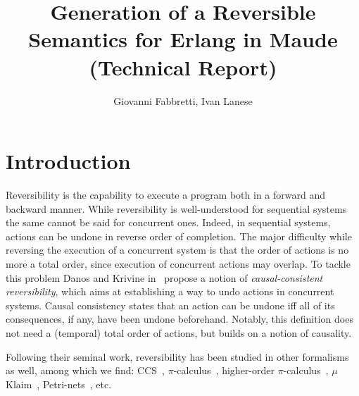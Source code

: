 \documentclass{article}[12pt,a4paper]
\theoremstyle{definition}
\begin{document}
\title{Generation of a Reversible Semantics for Erlang in Maude (Technical Report)}

\author{Giovanni Fabbretti, Ivan Lanese}
\date{}

\maketitle %


\section{Introduction}


Reversibility is the capability to execute a program both in a forward
and backward manner. While reversibility is well-understood for
sequential systems the same cannot be said for concurrent
ones. Indeed, in sequential systems, actions can be undone in reverse
order of completion.  The major difficulty while reversing the
execution of a concurrent system is that the order of actions is no
more a total order, since execution of concurrent actions may overlap.
To tackle this problem Danos and Krivine in~\cite{DanosK04} propose a
notion of \emph{causal-consistent reversibility}, which aims at
establishing a way to undo actions in concurrent systems. Causal
consistency states that an action can be undone iff all of its
consequences, if any, have been undone beforehand. Notably, this
definition does not need a (temporal) total order of actions, but
builds on a notion of causality.

Following their seminal work, reversibility has been studied in other formalisms
as well, among which we find: CCS~\cite{DanosK04,PhillipsU07}, $\pi$-calculus~\cite{CristescuKV13}, higher-order $\pi$-calculus~\cite{LaneseMS16},
$\mu$Klaim~\cite{GiachinoLMT17}, Petri-nets~\cite{PhilippouP18,MelgrattiMU20}, etc.
\end{document}
